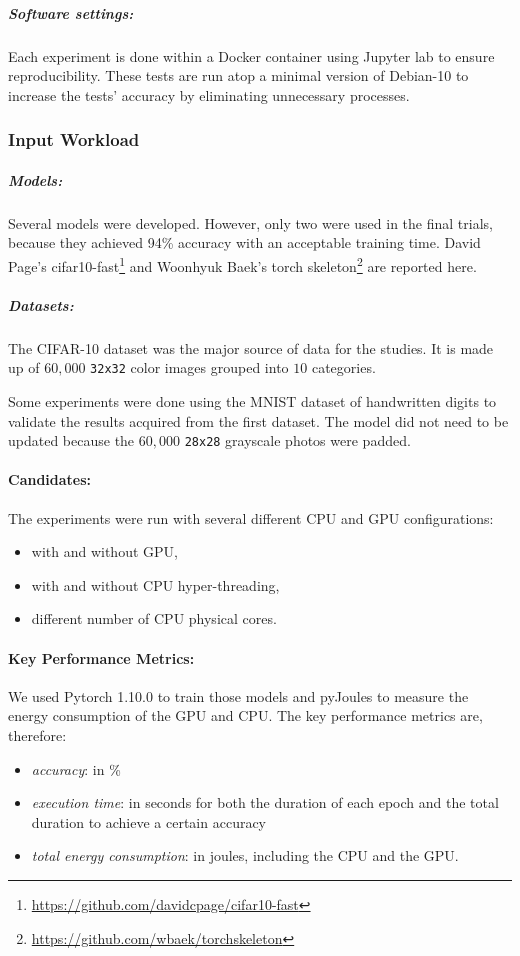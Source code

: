 \subparagraph{Software settings:}
Each experiment is done within a Docker container using Jupyter lab to ensure reproducibility.
These tests are run atop a minimal version of Debian-10 to increase the tests' accuracy by eliminating unnecessary processes.

\subsubsection{Input Workload}
\subparagraph{Models:}
Several models were developed.
However, only two were used in the final trials, because they achieved 94\% accuracy with an acceptable training time.
David Page's \textsf{cifar10-fast}\footnote{\url{https://github.com/davidcpage/cifar10-fast}} and Woonhyuk Baek's torch skeleton\footnote{\url{https://github.com/wbaek/torchskeleton}} are reported here.

\subparagraph{Datasets:}
The CIFAR-10 dataset was the major source of data for the studies.
It is made up of $60,000$ \texttt{32x32} color images grouped into $10$ categories.

Some experiments were done using the MNIST dataset of handwritten digits to validate the results acquired from the first dataset.
The model did not need to be updated because the $60,000$ \texttt{28x28} grayscale photos were padded.

\paragraph{Candidates:}
The experiments were run with several different CPU and GPU configurations:
\begin{itemize}
    \item with and without GPU,
    \item with and without CPU hyper-threading,
    \item different number of CPU physical cores.
\end{itemize}

\paragraph{Key Performance Metrics:}
We used Pytorch 1.10.0 to train those models and pyJoules to measure the energy consumption of the GPU and CPU.
The key performance metrics are, therefore:
\begin{itemize}
    \item \emph{accuracy}: in \%
    \item \emph{execution time}: in seconds for both the duration of each epoch and the total duration to achieve a certain accuracy
    \item \emph{total energy consumption}: in joules, including the CPU and the GPU.
\end{itemize}



